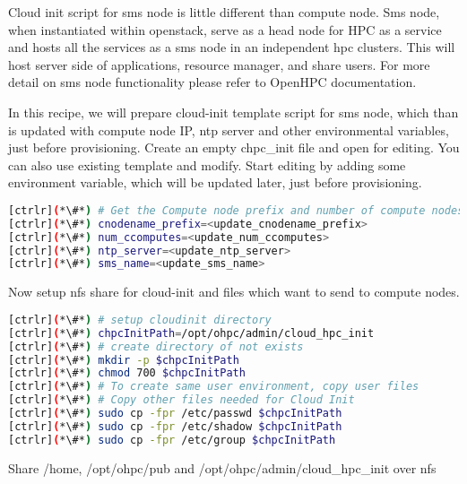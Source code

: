 Cloud init script for sms node is little different than compute node. Sms node, when instantiated within openstack, serve as a head node for HPC as a service and hosts all the services as a sms node in an independent hpc clusters. This will host server side of applications, resource manager, and share users. For more detail on sms node functionality please refer to OpenHPC documentation.

In this recipe, we will prepare cloud-init template script for sms node, which than is updated with compute node IP, ntp server and other environmental variables, just before provisioning. 
Create an empty chpc\_init file and open for editing. You can also use existing template and modify. Start editing by adding some environment variable, which will be updated later, just before provisioning.


\begin{lstlisting}[language=bash,keywords={}]
[ctrlr](*\#*) # Get the Compute node prefix and number of compute nodes
[ctrlr](*\#*) cnodename_prefix=<update_cnodename_prefix>
[ctrlr](*\#*) num_ccomputes=<update_num_ccomputes>
[ctrlr](*\#*) ntp_server=<update_ntp_server>
[ctrlr](*\#*) sms_name=<update_sms_name>
\end{lstlisting} 

Now setup nfs share for cloud-init and files which want to send to compute nodes.


\begin{lstlisting}[language=bash,keywords={}]
[ctrlr](*\#*) # setup cloudinit directory
[ctrlr](*\#*) chpcInitPath=/opt/ohpc/admin/cloud_hpc_init
[ctrlr](*\#*) # create directory of not exists
[ctrlr](*\#*) mkdir -p $chpcInitPath
[ctrlr](*\#*) chmod 700 $chpcInitPath
[ctrlr](*\#*) # To create same user environment, copy user files 
[ctrlr](*\#*) # Copy other files needed for Cloud Init
[ctrlr](*\#*) sudo cp -fpr /etc/passwd $chpcInitPath
[ctrlr](*\#*) sudo cp -fpr /etc/shadow $chpcInitPath
[ctrlr](*\#*) sudo cp -fpr /etc/group $chpcInitPath
\end{lstlisting} 

Share /home, /opt/ohpc/pub and /opt/ohpc/admin/cloud\_hpc\_init over nfs


